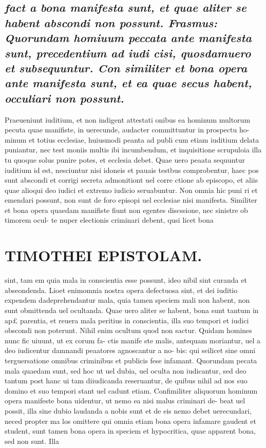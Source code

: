 \documentclass{article}
\begin{document}
\begin{pages}
\subsection*{\textit{fact a bona manifesta sunt, et quae aliter se habent abscondi non possunt. Frasmus: Quorundam homiuum peccata ante manifesta sunt, precedentium ad iudi cisi, quosdamuero et subsequuntur. Con similiter et bona opera ante manifesta sunt, et ea quae secus habent, occuliari non possunt. }}\pstart Praeueniunt iuditium, et non indigent attestati onibus ea hominum multorum pecuta quae manifiste, in uerecunde, audacter committuntur in prospectu ho- minum et totius ecclesiae, huiusmodi peanta ad publi cum etiam iuditium delata puniantur, nec test moniis multis ibi incumbendum, et inquisitione scrupuloia illa tu quoque solus punire potes, et ecclesia debet. Quae uero peaata sequuntur iuditium id est, nesciuntur nisi idoneis et pauais testbus comprobentur, haec pos sunt abscondi et corrigi secreta admonitiont uel corre ctione ab episcopo, et aliis quae alioqui deo iudici et extremo iudicio seruabuntur. Non omnia hic puni ri et emendari possunt, non sunt de foro episopi uel ecclesiae nisi manifesta.  \pend\pstart Similiter et bona opera quaedam manifiste fiunt non egentes discssione, nec sinistre ob timorem ocul- te nuper electionis criminari debent, qusi licet bona  \pend
\section*{TIMOTHEI EPISTOLAM. }
\marginpar{[ p.151 ]}\pstart sint, tam em quia mala in conscientia esse possunt, ideo nibil sint curanda et abseondenda. Lioet enimomnia nostra opera defectuosa sint, et dei iuditio expendem dadeprehendantur mala, quia tamen speciem mali non habent, non sunt obmittenda uel ocultanda. Quae uero aliter se habent, bona sunt tantum in ap£ parentia, et reuera mala peritius in conscientia, illa suo tempori et iudici obscondi non poterunt. Nihil enim ocultum quod non sactur.  \pend\pstart Quidam homines nunc fic uiuunt, ut ex corum fa- ctis manife ste malis, antequam moriantur, uel a deo iudicentur damnandi peaatores agnoscantur a no- bis: qui seilicet sine omni terguersatione omnibus criminibus et publicis fese infamant. Quorundam pecata mala quaedam sunt, sed hoc ut uel dubia, uel oculta non iudicantur, sed deo tantum post hanc ui tam diiudicanda reseruantur, de quibus nihil ad nos suo domino et suo tempori stant uel cadunt etiam. Confimiliter aliquorum hominum opera manifeste bona uidentur, ut nemo ea nisi malus criminari de- beat uel possit, illa sine dubio laudanda a nobis sunt et de eis nemo debet uerecundari, neced propter ma los omittere qui omnia etiam bona opera infamare gaudent et student, sunt tamen bona opera in speciem et hypocritica, quae apparent bona, sed non sunt. Illa  \pend

\end{pages}
\end{document}
